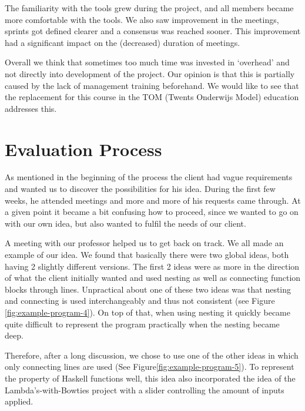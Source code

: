 The familiarity with the tools grew during the project, and all members became more comfortable with the tools. We also saw improvement in the meetings, sprints got defined clearer and a consensus was reached sooner. This improvement had a significant impact on the (decreased) duration of meetings.

Overall we think that sometimes too much time was invested in `overhead' and not directly into development of the project. Our opinion is that this is partially caused by the lack of management training beforehand. We would like to see that the replacement for this course in the TOM (Twents Onderwijs Model) education addresses this.

\section{Evaluation Process}

As mentioned in the beginning of the process the client had vague requirements and wanted us to discover the possibilities for his idea.
During the first few weeks, he attended meetings and more and more of his requests came through.  At a given point it became a bit confusing how to proceed, since we wanted to go on with our own idea, but also wanted to fulfil the needs of our client.

A meeting with our professor helped us to get back on track. We all made an example of our idea. We found that basically there were two global ideas, both having 2 slightly different versions. The first 2 ideas were as more in the direction of what the client initially wanted and used nesting as well as connecting function blocks through lines. Unpractical about one of these two ideas was that nesting and connecting is used interchangeably and thus not consistent (see Figure \ref{fig:example-program-4}). On top of that, when using nesting it quickly became quite difficult to represent the program practically when the nesting became deep.

Therefore, after a long discussion, we chose to use one of the other ideas in which only connecting lines are used (See Figure\ref{fig:example-program-5}). To represent the property of Haskell functions well, this idea also incorporated the idea of the Lambda's-with-Bowties project with a slider controlling the amount of inputs applied.

